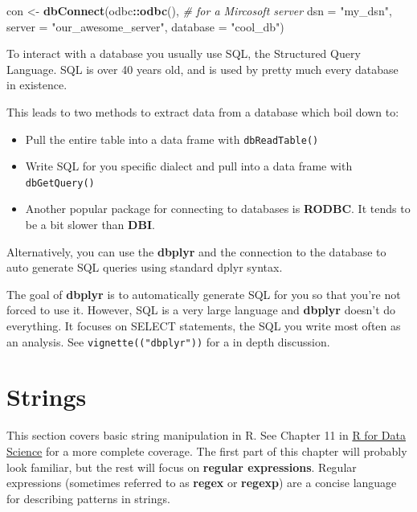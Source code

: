 \documentclass[]{book}
\newenvironment{Shaded}{\begin{snugshade}}{\end{snugshade}}
\newcommand{\KeywordTok}[1]{\textcolor[rgb]{0.13,0.29,0.53}{\textbf{#1}}}
\newcommand{\DataTypeTok}[1]{\textcolor[rgb]{0.13,0.29,0.53}{#1}}
\newcommand{\StringTok}[1]{\textcolor[rgb]{0.31,0.60,0.02}{#1}}
\newcommand{\CommentTok}[1]{\textcolor[rgb]{0.56,0.35,0.01}{\textit{#1}}}
\newcommand{\OperatorTok}[1]{\textcolor[rgb]{0.81,0.36,0.00}{\textbf{#1}}}
\newcommand{\NormalTok}[1]{#1}
\providecommand{\tightlist}{%
  \setlength{\itemsep}{0pt}\setlength{\parskip}{0pt}}
\newenvironment{rmdblock}[1]
  {\begin{shaded*}
  \begin{itemize}
  \renewcommand{\labelitemi}{
    \raisebox{-.7\height}[0pt][0pt]{
      {\setkeys{Gin}{width=3em,keepaspectratio}\texttt{[image: images/\#1]}}
    }
  }
  \item
  }
  {
  \end{itemize}
  \end{shaded*}
  }
\newenvironment{rmdnote}
  {\begin{rmdblock}{note}}
  {\end{rmdblock}}
\theoremstyle{definition}
\theoremstyle{definition}
\theoremstyle{definition}
\theoremstyle{remark}
\begin{document}
\begin{Shaded}
\begin{Highlighting}[]
\NormalTok{con <-}\StringTok{ }\KeywordTok{dbConnect}\NormalTok{(odbc}\OperatorTok{::}\KeywordTok{odbc}\NormalTok{(),               }\CommentTok{# for a Mircosoft server}
                 \DataTypeTok{dsn      =} \StringTok{"my_dsn"}\NormalTok{, }
                 \DataTypeTok{server   =} \StringTok{"our_awesome_server"}\NormalTok{,}
                 \DataTypeTok{database =} \StringTok{"cool_db"}\NormalTok{)}
\end{Highlighting}
\end{Shaded}

To interact with a database you usually use SQL, the Structured Query
Language. SQL is over 40 years old, and is used by pretty much every
database in existence.

This leads to two methods to extract data from a database which boil
down to:

\begin{itemize}
\tightlist
\item
  Pull the entire table into a data frame with \texttt{dbReadTable()}
\item
  Write SQL for you specific dialect and pull into a data frame with
  \texttt{dbGetQuery()}
\end{itemize}

\begin{rmdnote}
Another popular package for connecting to databases is \textbf{RODBC}.
It tends to be a bit slower than \textbf{DBI}.
\end{rmdnote}

Alternatively, you can use the \textbf{dbplyr} and the connection to the
database to auto generate SQL queries using standard dplyr syntax.

The goal of \textbf{dbplyr} is to automatically generate SQL for you so
that you're not forced to use it. However, SQL is a very large language
and \textbf{dbplyr} doesn't do everything. It focuses on SELECT
statements, the SQL you write most often as an analysis. See
\texttt{vignette(("dbplyr"))} for a in depth discussion.

\hypertarget{strings}{\chapter{Strings}\label{strings}}

This section covers basic string manipulation in R. See Chapter 11 in
\href{http://r4ds.had.co.nz/strings.html}{R for Data Science} for a more
complete coverage. The first part of this chapter will probably look
familiar, but the rest will focus on \textbf{regular expressions}.
Regular expressions (sometimes referred to as \textbf{regex} or
\textbf{regexp}) are a concise language for describing patterns in
strings.
\end{document}

